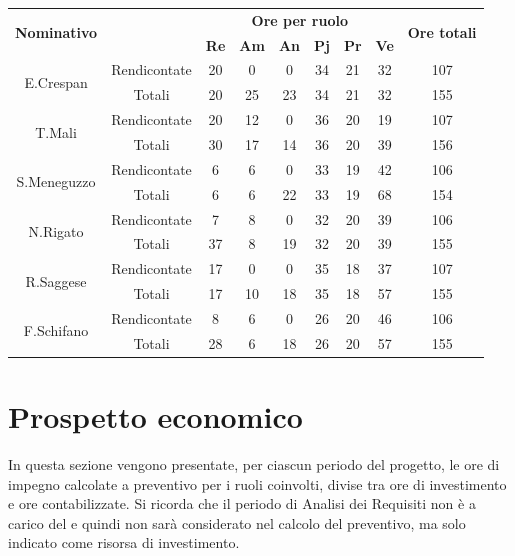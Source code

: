 \begin{center}
	\begin{tabular}{|c|c|c|c|c|c|c|c|c|}
		\hline
		\multirow{2}{*}{\textbf{Nominativo}} & & \multicolumn{6}{c|}{\textbf{Ore per ruolo}} & \multirow{2}{*}{\textbf{Ore totali}} \\
		& & \textbf{Re} & \textbf{Am} & \textbf{An} & \textbf{Pj} & \textbf{Pr} & \textbf{Ve} & \\
		\hline
		\hline
		\multirow{2}{*}{E.Crespan}		&	Rendicontate	&	20	&	0	&	0	&	34	&	21	& 32 	&	107	\\
		\cline{2-9}
		&	Totali			&	20	&	25	&	23	&	34	&	21	& 	32	&	155	\\
		\hline
		\hline
		\multirow{2}{*}{T.Mali}	&	Rendicontate	&	20	&	12	&	0	&	36	&	20	&  19	&	107	\\
		\cline{2-9}
		&	Totali			&	30	&	17	&	14	&	36	&	20	& 	39	&	156	\\
		\hline
		\hline
		\multirow{2}{*}{S.Meneguzzo}	&	Rendicontate	&	6	&	6	&	0	&	33	&	19	&	42	&	106	\\
		\cline{2-9}
		&	Totali			&	6	&	6	&	22	&	33	&	19	&	68	&	154	\\
		\hline
		\hline
		\multirow{2}{*}{N.Rigato}	&	Rendicontate	&	7	&	8	&	0	&	32	&	20	&	39	&	106	\\
		\cline{2-9}
		&	Totali			&	37	&	8	&	19	&	32	&	20	&	39	&	155	\\
		\hline
		\hline
		\multirow{2}{*}{R.Saggese}		&	Rendicontate	&	17	&	0	&	0	&	35	&	18	& 	37	&	107	\\
		\cline{2-9}
		&	Totali			&	17	&	10	&	18	&	35	&	18	& 	57	&	155	\\
		\hline
		\hline
		\multirow{2}{*}{F.Schifano}	&	Rendicontate	&	8	&	6	&	0	&	26	&	20	& 	46	&	106	\\
		\cline{2-9}
		&	Totali			&	28	&	6	&	18	&	26	&	20	& 	57	&	155	\\
		\hline
		
	\end{tabular}
\end{center}

\section{Prospetto economico}
In questa sezione vengono presentate, per ciascun periodo del progetto, le ore di impegno calcolate
a preventivo per i ruoli coinvolti, divise tra ore di investimento e ore contabilizzate. Si ricorda che
il periodo di Analisi dei Requisiti non è a carico del  e quindi non sarà considerato
nel calcolo del preventivo, ma solo indicato come risorsa di investimento.

